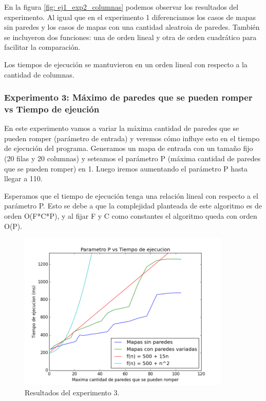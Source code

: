 \par En la figura \ref{fig: ej1_exp2_columnas} podemos observar los resultados del experimento. Al igual que en el experimento 1 diferenciamos los casos de mapas sin paredes y los casos de mapas con una cantidad aleatroia de paredes. También se incluyeron dos funciones: una de orden lineal y otra de orden cuadrático para facilitar la comparación.

\par Los tiempos de ejecución se mantuvieron en un orden lineal con respecto a la cantidad de columnas.

\subsubsection{Experimento 3: Máximo de paredes que se pueden romper vs Tiempo de ejeución}

\par En este experimento vamos a variar la máxima cantidad de paredes que se pueden romper (parámetro de entrada) y veremos cómo influye esto en el tiempo de ejecución del programa. Generamos un mapa de entrada con un tamaño fijo (20 filas y 20 columnas) y seteamos el parámetro P (máxima cantidad de paredes que se pueden romper) en 1. Luego iremos aumentando el parámetro P hasta llegar a 110.

\par Esperamos que el tiempo de ejecución tenga una relación lineal con respecto a el parámetro P. Esto se debe a que la complejidad planteada de este algoritmo es de orden O(F*C*P), y al fijar F y C como constantes el algoritmo queda con orden O(P).

\begin{figure}[H]
	\centering
	\includegraphics[width=0.9\textwidth]{Problema1/img/exp3_paredes.png}
	\caption{Resultados del experimento 3.}
	\label{fig: ej1_exp3_paredes}
\end{figure}

